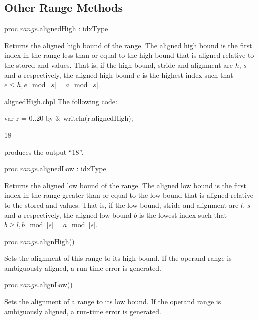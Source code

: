 \subsection{Other Range Methods}

\begin{protohead}
proc $range$.alignedHigh : idxType
\end{protohead}
\begin{protobody}
Returns the aligned high bound of the range.  
The aligned high bound is the first
index in the range less than or equal to the high bound that is
aligned relative to the stored  and  values.  That
is, if the high bound, stride and alignment are $h$, $s$ and $a$ respectively,
the aligned high bound $e$ is the highest index such that $e \leq h, e\!\mod |s| =
a\!\mod |s|$.
\end{protobody}
\begin{chapelexample}{alignedHigh.chpl}
The following code:
\begin{chapel}
var r = 0..20 by 3;
writeln(r.alignedHigh);
\end{chapel}
\begin{chapeloutput}
18
\end{chapeloutput}
produces the output ``18''.
\end{chapelexample}

\begin{protohead}
proc $range$.alignedLow : idxType
\end{protohead}
\begin{protobody}
Returns the aligned low bound of the range.  
The aligned low bound is the first
index in the range greater than or equal to the low bound that is
aligned relative to the stored  and  values.  That
is, if the low bound, stride and alignment are $l$, $s$ and $a$ respectively,
the aligned low bound $b$ is the lowest index such that $b \geq l, b\!\mod |s| =
a\!\mod |s|$.
\end{protobody}

\begin{protohead}
proc $range$.alignHigh()
\end{protohead}
\begin{protobody}
Sets the alignment of this range to its high bound.
If the operand range is ambiguously aligned, a run-time error is generated.
\end{protobody}

\begin{protohead}
proc $range$.alignLow()
\end{protohead}
\begin{protobody}
Sets the alignment of a range to its low bound.
If the operand range is ambiguously aligned, a run-time error is generated.
\end{protobody}

